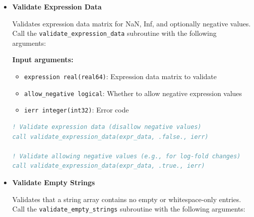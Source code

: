 \documentclass[11pt]{article}
\begin{document}
\begin{enumerate}
\begin{itemize}
\begin{itemize}
	      	      	\item \texttt{ierr integer(int32)}: Error code
	      	      \end{itemize}
	      	      \begin{lstlisting}[language=Fortran, caption={Validate Data Structure}]
call validate_data_structure(n_genes, n_families, n_samples, &
                            gene_ids, family_ids, gene_to_fam, &
                            expr_data, centroids, shift_vectors, &
                            ierr)
	      	      \end{lstlisting}
	      	      
	      	\item \textbf{Validate Expression Data}
	      	      
	      	      Validates expression data matrix for NaN, Inf, and optionally negative
	      	      values. Call the \texttt{validate\_expression\_data} subroutine with the
	      	      following arguments:
	      	      
	      	      \textbf{Input arguments:}
	      	      \begin{itemize}
	      	      	\item \texttt{expression real(real64)}: Expression data matrix to validate
	      	      	      
	      	      	\item \texttt{allow\_negative logical}: Whether to allow negative expression
	      	      	      values
	      	      	      
	      	      	\item \texttt{ierr integer(int32)}: Error code
	      	      \end{itemize}
	      	      \begin{lstlisting}[language=Fortran, caption={Validate Expression Data}]
! Validate expression data (disallow negative values)
call validate_expression_data(expr_data, .false., ierr)

! Validate allowing negative values (e.g., for log-fold changes)
call validate_expression_data(expr_data, .true., ierr)
	      	      \end{lstlisting}
	      	      
	      	\item \textbf{Validate Empty Strings}
	      	      
	      	      Validates that a string array contains no empty or whitespace-only entries.
	      	      Call the \texttt{validate\_empty\_strings} subroutine with the following
	      	      arguments:
	      	      

\end{itemize}
\end{enumerate}
\end{document}
